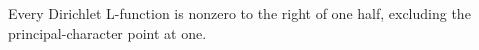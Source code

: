 \begin{definition}
\label{everyDef}
\leanok
Every Dirichlet L-function is nonzero to the right of one half, excluding the principal-character point at one.
\end{definition}
